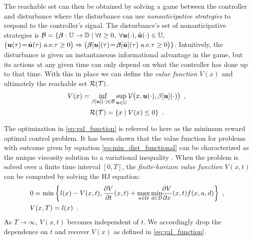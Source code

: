

The reachable set can then be obtained by solving a game between the controller and disturbance where the disturbance can use \emph{nonanticipative strategies} to respond to the controller's signal. The disturbance's set of nonanticipative strategies is $\mathcal{B} = \{\bm{\beta}:\mathbb{U}\to\mathbb{D}\;|\;
\forall t\ge 0,\; \forall \bm{u}(\cdot),\hat{\bm{u}}(\cdot)\in\mathbb{U},$
${\big(\bm{u}(\tau) \!=\! \hat{\bm{u}}(\tau)\text{ a.e.} \tau\ge0\big)\Rightarrow
{\big(\bm{\beta}[\bm{u}](\tau) \!=\! \bm{\beta}[\hat{\bm{u}}](\tau)}{\text{ a.e.} \tau\ge0\big)}}\}$. Intuitively, the disturbance is given an instantaneous informational advantage in the game, but its actions at any given time can only depend on what the controller has done up to that time. With this in place we can define the \emph{value function} $V(x)$ and ultimately the reachable set $\mathcal{R}(\mathcal{T})$. 
%
\begin{equation} \label{eq:val_function}
V(x)=\inf_{\beta[\bm{u}](\cdot) \in \mathcal{B}} \sup_{\bm{u} \in \mathbb{U}}\mathcal{V}\big(x,\bm{u}(\cdot),\beta[\bm{u}](\cdot)\big) \enspace,
\end{equation}
%
\begin{equation} \label{eq:reach_set}
\mathcal{R}(\mathcal{T}) = \{x \mid V(x) \le 0\} \enspace.
\end{equation}  

The optimization in \eqref{eq:val_function} is referred to here as the minimum reward optimal control problem. It has been shown that the value function for problems with outcome given by equation \eqref{eq:min_dist_functional} can be characterized as the unique viscosity solution to a variational inequality \cite{Barron1989,Barron1990}. When the problem is solved over a finite time interval $[0,T]$, the \emph{finite-horizon value function} $V(x,t)$ can be computed by solving the HJ equation: 
%
\begin{equation} \label{eq:HJ_mr}
\begin{split} 
    & 0 = \min\left\{l(x)-V(x,t), \frac{\partial V}{\partial t}(x,t)+ \max_{u\in\mathcal{U}} \min_{ d\in\mathcal{D}} \!\!\frac{\partial V}{\partial x}(x,t) f(x,u, d)\right\} \;,\\
    &V(x,T) = l(x) \enspace.
\end{split}
\end{equation}
%
 As $T \rightarrow \infty$, $V(x,t)$ becomes independent of $t$. We accordingly drop the dependence on $t$ and recover $V(x)$ as defined in \eqref{eq:val_function}. 


